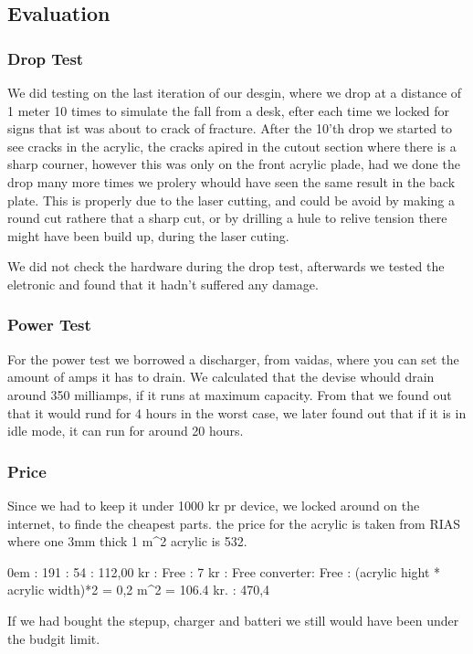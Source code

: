 \subsection{Evaluation}
\subsubsection{Drop Test}
We did testing on the last iteration of our desgin, where we drop at a distance of 1 meter 10 times to simulate the fall from a desk, efter each time we locked for signs that ist was about to crack of fracture.
After the 10'th drop we started to see cracks in the acrylic, the cracks apired in the cutout section where there is a sharp courner, however this was only on the front acrylic plade, had we done the drop many more times we prolery whould have seen the same result in the back plate. 
This is properly due to the laser cutting, and could be avoid by making a round cut rathere that a sharp cut, or by drilling a hule to relive tension there might have been build up, during the laser cuting.

We did not check the hardware during the drop test, afterwards we tested the eletronic and found that it hadn't suffered any damage.

\subsubsection{Power Test}
For the power test we borrowed a discharger, from vaidas, where you can set the amount of amps it has to drain.
We calculated that the devise whould drain around 350 milliamps, if it runs at maximum capacity.
From that we found out that it would rund for 4 hours in the worst case, we later found out that if it is in idle mode, it can run for around 20 hours.

\subsubsection{Price}
Since we had to keep it under 1000 kr pr device, we locked around on the internet, to finde the cheapest parts.
the price for the acrylic is taken from RIAS where one 3mm thick 1 m^2 acrylic is 532.
\begin{itemize} \itemsep0em
	\WIFI: 191 
	\Arduino: 54
	\RFID: 112,00 kr
	\Batterie: Free
	\LED: 7 kr
	\Charger: Free
	\Stepup converter: Free
	\Acryl: (acrylic hight * acrylic width)*2 = 0,2 m^2 = 106.4 kr.
	\Total: 470,4
\end{itemize}
If we had bought the stepup, charger and batteri we still would have been under the budgit limit.
